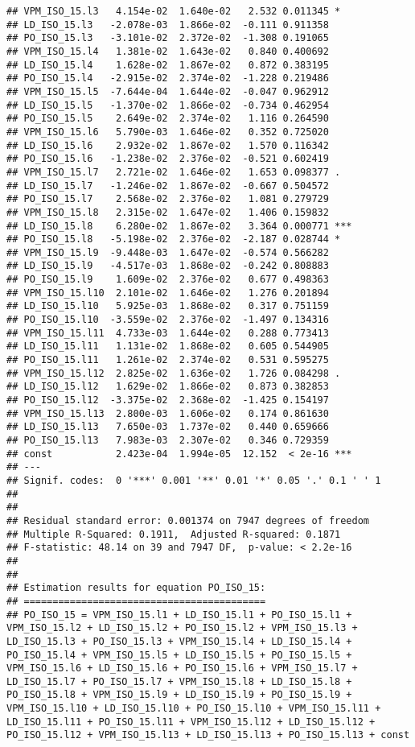 \documentclass[
]{article}
\begin{document}
\begin{verbatim}
## VPM_ISO_15.l3   4.154e-02  1.640e-02   2.532 0.011345 *  
## LD_ISO_15.l3   -2.078e-03  1.866e-02  -0.111 0.911358    
## PO_ISO_15.l3   -3.101e-02  2.372e-02  -1.308 0.191065    
## VPM_ISO_15.l4   1.381e-02  1.643e-02   0.840 0.400692    
## LD_ISO_15.l4    1.628e-02  1.867e-02   0.872 0.383195    
## PO_ISO_15.l4   -2.915e-02  2.374e-02  -1.228 0.219486    
## VPM_ISO_15.l5  -7.644e-04  1.644e-02  -0.047 0.962912    
## LD_ISO_15.l5   -1.370e-02  1.866e-02  -0.734 0.462954    
## PO_ISO_15.l5    2.649e-02  2.374e-02   1.116 0.264590    
## VPM_ISO_15.l6   5.790e-03  1.646e-02   0.352 0.725020    
## LD_ISO_15.l6    2.932e-02  1.867e-02   1.570 0.116342    
## PO_ISO_15.l6   -1.238e-02  2.376e-02  -0.521 0.602419    
## VPM_ISO_15.l7   2.721e-02  1.646e-02   1.653 0.098377 .  
## LD_ISO_15.l7   -1.246e-02  1.867e-02  -0.667 0.504572    
## PO_ISO_15.l7    2.568e-02  2.376e-02   1.081 0.279729    
## VPM_ISO_15.l8   2.315e-02  1.647e-02   1.406 0.159832    
## LD_ISO_15.l8    6.280e-02  1.867e-02   3.364 0.000771 ***
## PO_ISO_15.l8   -5.198e-02  2.376e-02  -2.187 0.028744 *  
## VPM_ISO_15.l9  -9.448e-03  1.647e-02  -0.574 0.566282    
## LD_ISO_15.l9   -4.517e-03  1.868e-02  -0.242 0.808883    
## PO_ISO_15.l9    1.609e-02  2.376e-02   0.677 0.498363    
## VPM_ISO_15.l10  2.101e-02  1.646e-02   1.276 0.201894    
## LD_ISO_15.l10   5.925e-03  1.868e-02   0.317 0.751159    
## PO_ISO_15.l10  -3.559e-02  2.376e-02  -1.497 0.134316    
## VPM_ISO_15.l11  4.733e-03  1.644e-02   0.288 0.773413    
## LD_ISO_15.l11   1.131e-02  1.868e-02   0.605 0.544905    
## PO_ISO_15.l11   1.261e-02  2.374e-02   0.531 0.595275    
## VPM_ISO_15.l12  2.825e-02  1.636e-02   1.726 0.084298 .  
## LD_ISO_15.l12   1.629e-02  1.866e-02   0.873 0.382853    
## PO_ISO_15.l12  -3.375e-02  2.368e-02  -1.425 0.154197    
## VPM_ISO_15.l13  2.800e-03  1.606e-02   0.174 0.861630    
## LD_ISO_15.l13   7.650e-03  1.737e-02   0.440 0.659666    
## PO_ISO_15.l13   7.983e-03  2.307e-02   0.346 0.729359    
## const           2.423e-04  1.994e-05  12.152  < 2e-16 ***
## ---
## Signif. codes:  0 '***' 0.001 '**' 0.01 '*' 0.05 '.' 0.1 ' ' 1
## 
## 
## Residual standard error: 0.001374 on 7947 degrees of freedom
## Multiple R-Squared: 0.1911,  Adjusted R-squared: 0.1871 
## F-statistic: 48.14 on 39 and 7947 DF,  p-value: < 2.2e-16 
## 
## 
## Estimation results for equation PO_ISO_15: 
## ========================================== 
## PO_ISO_15 = VPM_ISO_15.l1 + LD_ISO_15.l1 + PO_ISO_15.l1 + VPM_ISO_15.l2 + LD_ISO_15.l2 + PO_ISO_15.l2 + VPM_ISO_15.l3 + LD_ISO_15.l3 + PO_ISO_15.l3 + VPM_ISO_15.l4 + LD_ISO_15.l4 + PO_ISO_15.l4 + VPM_ISO_15.l5 + LD_ISO_15.l5 + PO_ISO_15.l5 + VPM_ISO_15.l6 + LD_ISO_15.l6 + PO_ISO_15.l6 + VPM_ISO_15.l7 + LD_ISO_15.l7 + PO_ISO_15.l7 + VPM_ISO_15.l8 + LD_ISO_15.l8 + PO_ISO_15.l8 + VPM_ISO_15.l9 + LD_ISO_15.l9 + PO_ISO_15.l9 + VPM_ISO_15.l10 + LD_ISO_15.l10 + PO_ISO_15.l10 + VPM_ISO_15.l11 + LD_ISO_15.l11 + PO_ISO_15.l11 + VPM_ISO_15.l12 + LD_ISO_15.l12 + PO_ISO_15.l12 + VPM_ISO_15.l13 + LD_ISO_15.l13 + PO_ISO_15.l13 + const 

\end{verbatim}
\end{document}
